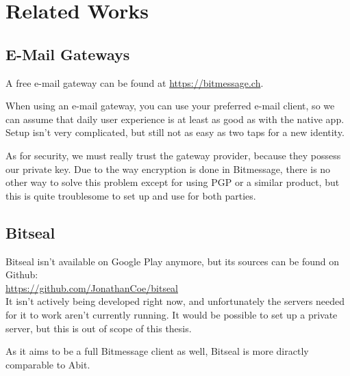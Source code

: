 \documentclass{bfh}
\begin{document}
  \newpage
  \section{Related Works}
  \subsection{E-Mail Gateways}
  A free e-mail gateway can be found at \url{https://bitmessage.ch}.

  When using an e-mail gateway, you can use your preferred e-mail client, so we can assume that daily user experience is at least as good as with the native app. Setup isn't very complicated, but still not as easy as two taps for a new identity.

  As for security, we must really trust the gateway provider, because they possess our private key. Due to the way encryption is done in Bitmessage, there is no other way to solve this problem except for using \ac{PGP} or a similar product, but this is quite troublesome to set up and use for both parties.


  \subsection{Bitseal}
  Bitseal isn't available on Google Play anymore, but its sources can be found on Github:\\
  \url{https://github.com/JonathanCoe/bitseal}\\
  It isn't actively being developed right now, and unfortunately the servers needed for it to work aren't currently running. It would be possible to set up a private server, but this is out of scope of this thesis.

  As it aims to be a full Bitmessage client as well, Bitseal is more diractly comparable to Abit.
\end{document}
